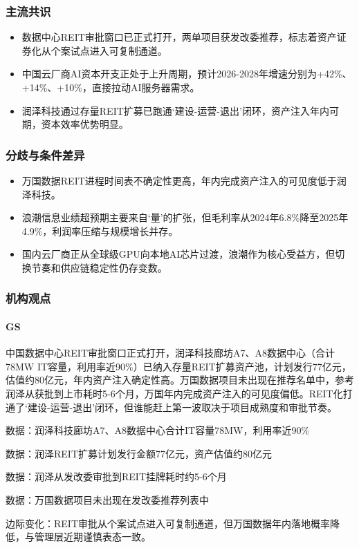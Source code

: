 \documentclass[11pt]{ctexart}
\begin{document}
\subsubsection*{主流共识}
\begin{itemize}
  \item 数据中心REIT审批窗口已正式打开，两单项目获发改委推荐，标志着资产证券化从个案试点进入可复制通道。
  \item 中国云厂商AI资本开支正处于上升周期，预计2026-2028年增速分别为+42\%、+14\%、+10\%，直接拉动AI服务器需求。
  \item 润泽科技通过存量REIT扩募已跑通‘建设-运营-退出’闭环，资产注入年内可期，资本效率优势明显。
\end{itemize}
\subsubsection*{分歧与条件差异}
\begin{itemize}
  \item 万国数据REIT进程时间表不确定性更高，年内完成资产注入的可见度低于润泽科技。
  \item 浪潮信息业绩超预期主要来自‘量’的扩张，但毛利率从2024年6.8\%降至2025年4.9\%，利润率压缩与规模增长并存。
  \item 国内云厂商正从全球级GPU向本地AI芯片过渡，浪潮作为核心受益方，但切换节奏和供应链稳定性仍存变数。
\end{itemize}
\subsubsection*{机构观点}
\paragraph{GS} 中国数据中心REIT审批窗口正式打开，润泽科技廊坊A7、A8数据中心（合计78MW IT容量，利用率近90\%）已纳入存量REIT扩募资产池，计划发行77亿元，估值约80亿元，年内资产注入确定性高。万国数据项目未出现在推荐名单中，参考润泽从获批到上市耗时5-6个月，万国年内完成资产注入的可见度偏低。REIT化打通了‘建设-运营-退出’闭环，但谁能赶上第一波取决于项目成熟度和审批节奏。
{\small\color{refgray}数据：润泽科技廊坊A7、A8数据中心合计IT容量78MW，利用率近90\%\par}
{\small\color{refgray}数据：润泽REIT扩募计划发行金额77亿元，资产估值约80亿元\par}
{\small\color{refgray}数据：润泽从发改委审批到REIT挂牌耗时约5-6个月\par}
{\small\color{refgray}数据：万国数据项目未出现在发改委推荐列表中\par}
{\small\color{refgray}边际变化：REIT审批从个案试点进入可复制通道，但万国数据年内落地概率降低，与管理层近期谨慎表态一致。\par}
\end{document}
